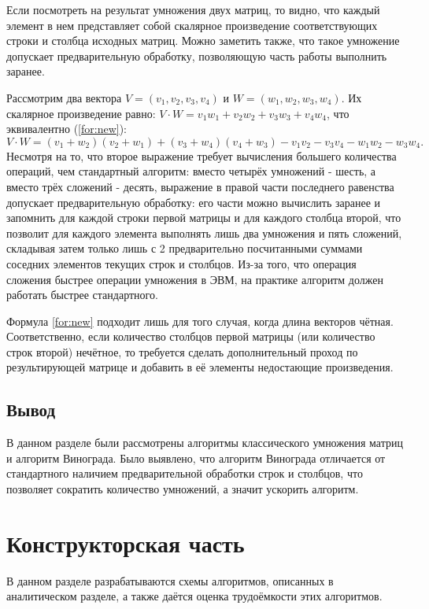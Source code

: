 \documentclass[12pt]{report}
\begin{document}
Если посмотреть на результат умножения двух матриц, то видно, что каждый элемент в нем представляет собой скалярное произведение соответствующих строки и столбца исходных матриц.
Можно заметить также, что такое умножение допускает предварительную обработку, позволяющую часть работы выполнить заранее.

Рассмотрим два вектора $V = (v_1, v_2, v_3, v_4)$ и $W = (w_1, w_2, w_3, w_4)$.
Их скалярное произведение равно: $V \cdot W = v_1w_1 + v_2w_2 + v_3w_3 + v_4w_4$, что эквивалентно (\ref{for:new}):
\begin{equation}
	\label{for:new}
		V \cdot W = (v_1 + w_2)(v_2 + w_1) + (v_3 + w_4)(v_4 + w_3) - v_1v_2 - v_3v_4 - w_1w_2 - w_3w_4.
\end{equation}
Несмотря на то, что второе выражение требует вычисления большего количества операций, чем стандартный алгоритм: вместо четырёх умножений - шесть, а вместо трёх сложений - десять, выражение в правой части последнего равенства допускает предварительную обработку: его части можно вычислить заранее и запомнить для каждой строки первой матрицы и для каждого столбца второй, что позволит для каждого элемента выполнять лишь два умножения и пять сложений, складывая затем только лишь с 2 предварительно посчитанными суммами соседних элементов текущих строк и столбцов.
Из-за того, что операция сложения быстрее операции умножения в ЭВМ, на практике алгоритм должен работать быстрее стандартного.

Формула \ref{for:new} подходит лишь для того случая, когда длина векторов чётная. Соответственно, если количество столбцов первой матрицы (или количество строк второй) нечётное, то требуется сделать дополнительный проход по результирующей матрице и добавить в её элементы недостающие произведения.


\section{Вывод}
	В данном разделе были рассмотрены алгоритмы классического умножения матриц и алгоритм Винограда. Было выявлено, что алгоритм Винограда отличается от стандартного наличием предварительной обработки строк и столбцов, что позволяет сократить количество умножений, а значит ускорить алгоритм. 
\clearpage

\chapter{Конструкторская часть}

В данном разделе разрабатываются схемы алгоритмов, описанных в аналитическом разделе, а также даётся оценка трудоёмкости этих алгоритмов.
\end{document}
